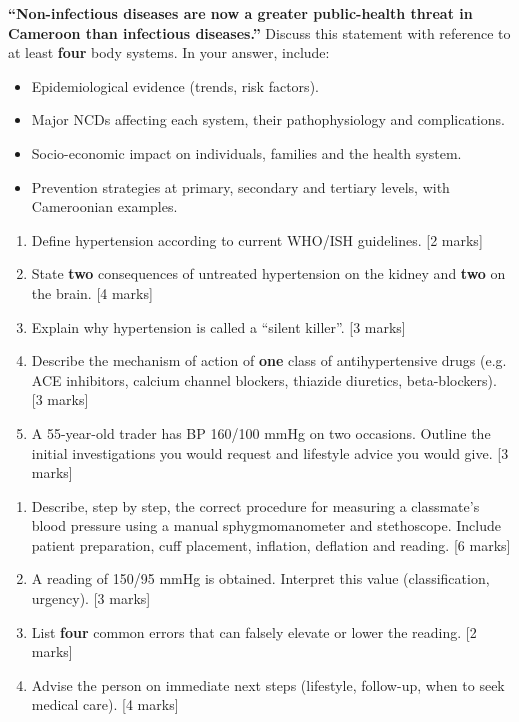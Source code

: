 \documentclass[11pt]{article}
\newcounter{popsec}
\newcounter{popsub}
\newcommand{\courssub}[1]{%
  \stepcounter{popsub}%
  \par\vspace{9pt}\noindent{\popxbold\fontsize{11.5}{13}\selectfont\color{popink}{\color{poporange}\thepopsec.\thepopsub}\hspace{6pt}#1}\par\nopagebreak\vspace{4pt}
}
\begin{document}
\courssub{I prepare for the GCE}

\begin{exercice}
\textbf{``Non-infectious diseases are now a greater public-health threat in Cameroon than infectious diseases.''} 
Discuss this statement with reference to at least \textbf{four} body systems. In your answer, include:
\begin{itemize}
\item Epidemiological evidence (trends, risk factors).
\item Major NCDs affecting each system, their pathophysiology and complications.
\item Socio-economic impact on individuals, families and the health system.
\item Prevention strategies at primary, secondary and tertiary levels, with Cameroonian examples.
\end{itemize}
\end{exercice}

\begin{exercice}
\begin{enumerate}
\item Define hypertension according to current WHO/ISH guidelines. [2 marks]
\item State \textbf{two} consequences of untreated hypertension on the kidney and \textbf{two} on the brain. [4 marks]
\item Explain why hypertension is called a ``silent killer''. [3 marks]
\item Describe the mechanism of action of \textbf{one} class of antihypertensive drugs (e.g. ACE inhibitors, calcium channel blockers, thiazide diuretics, beta-blockers). [3 marks]
\item A 55-year-old trader has BP 160/100 mmHg on two occasions. Outline the initial investigations you would request and lifestyle advice you would give. [3 marks]
\end{enumerate}
\end{exercice}

\begin{exercice}
\begin{enumerate}
\item Describe, step by step, the correct procedure for measuring a classmate's blood pressure using a manual sphygmomanometer and stethoscope. Include patient preparation, cuff placement, inflation, deflation and reading. [6 marks]
\item A reading of 150/95 mmHg is obtained. Interpret this value (classification, urgency). [3 marks]
\item List \textbf{four} common errors that can falsely elevate or lower the reading. [2 marks]
\item Advise the person on immediate next steps (lifestyle, follow-up, when to seek medical care). [4 marks]
\end{enumerate}
\end{exercice}
\end{document}
